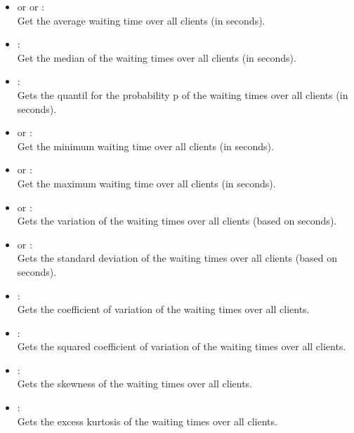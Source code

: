\begin{itemize}

\item
{} or  or :\\
Get the average waiting time over all clients (in seconds).

\item
{}:\\
Get the median of the waiting times over all clients (in seconds).

\item
{}:\\
Gets the quantil for the probability p of the waiting times over all clients (in seconds).

\item
{} or :\\
Get the minimum waiting time over all clients (in seconds).

\item
{} or :\\
Get the maximum waiting time over all clients (in seconds).

\item
{} or :\\
Gets the variation of the waiting times over all clients (based on seconds).

\item
{} or :\\
Gets the standard deviation of the waiting times over all clients (based on seconds).

\item
{}:\\
Gets the coefficient of variation of the waiting times over all clients. 

\item
{}:\\
Gets the squared coefficient of variation of the waiting times over all clients.

\item
{}:\\
Gets the skewness of the waiting times over all clients. 

\item
{}:\\
Gets the excess kurtosis of the waiting times over all clients. 


\end{itemize}
